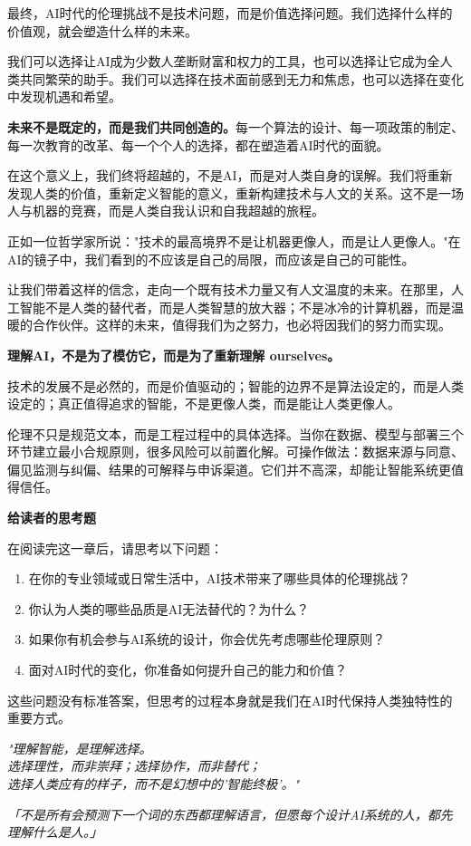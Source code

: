 最终，AI时代的伦理挑战不是技术问题，而是价值选择问题。我们选择什么样的价值观，就会塑造什么样的未来。

我们可以选择让AI成为少数人垄断财富和权力的工具，也可以选择让它成为全人类共同繁荣的助手。我们可以选择在技术面前感到无力和焦虑，也可以选择在变化中发现机遇和希望。

{\bf 未来不是既定的，而是我们共同创造的。}每一个算法的设计、每一项政策的制定、每一次教育的改革、每一个个人的选择，都在塑造着AI时代的面貌。

在这个意义上，我们终将超越的，不是AI，而是对人类自身的误解。我们将重新发现人类的价值，重新定义智能的意义，重新构建技术与人文的关系。这不是一场人与机器的竞赛，而是人类自我认识和自我超越的旅程。

正如一位哲学家所说："技术的最高境界不是让机器更像人，而是让人更像人。"在AI的镜子中，我们看到的不应该是自己的局限，而应该是自己的可能性。

让我们带着这样的信念，走向一个既有技术力量又有人文温度的未来。在那里，人工智能不是人类的替代者，而是人类智慧的放大器；不是冰冷的计算机器，而是温暖的合作伙伴。这样的未来，值得我们为之努力，也必将因我们的努力而实现。

\textbf{理解AI，不是为了模仿它，而是为了重新理解 ourselves。}

技术的发展不是必然的，而是价值驱动的；智能的边界不是算法设定的，而是人类设定的；真正值得追求的智能，不是更像人类，而是能让人类更像人。

伦理不只是规范文本，而是工程过程中的具体选择。当你在数据、模型与部署三个环节建立最小合规原则，很多风险可以前置化解。可操作做法：数据来源与同意、偏见监测与纠偏、结果的可解释与申诉渠道。它们并不高深，却能让智能系统更值得信任。

\begin{center}
{\bf 给读者的思考题}

在阅读完这一章后，请思考以下问题：
\begin{enumerate}
\item 在你的专业领域或日常生活中，AI技术带来了哪些具体的伦理挑战？
\item 你认为人类的哪些品质是AI无法替代的？为什么？
\item 如果你有机会参与AI系统的设计，你会优先考虑哪些伦理原则？
\item 面对AI时代的变化，你准备如何提升自己的能力和价值？
\end{enumerate}

这些问题没有标准答案，但思考的过程本身就是我们在AI时代保持人类独特性的重要方式。
\end{center}

\begin{center}
\textit{
"理解智能，是理解选择。\\
选择理性，而非崇拜；选择协作，而非替代；\\
选择人类应有的样子，而不是幻想中的'智能终极'。"}
\end{center}

\begin{center}
\textit{
「不是所有会预测下一个词的东西都理解语言，但愿每个设计AI系统的人，都先理解什么是人。」
}
\end{center}

\nocite{*}
\newpage
